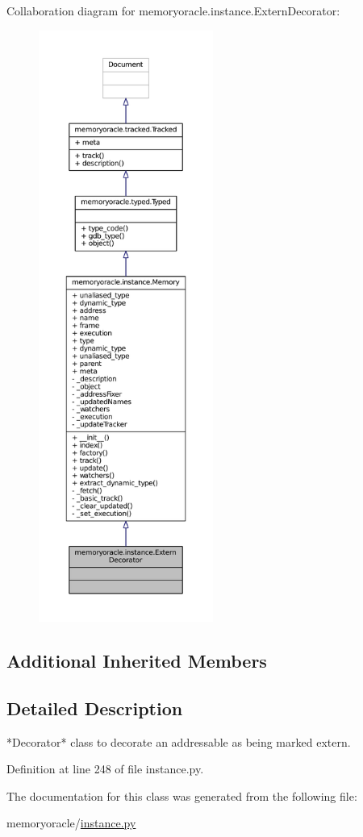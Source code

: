 Collaboration diagram for memoryoracle.\+instance.\+Extern\+Decorator\+:
\nopagebreak
\begin{figure}[H]
\begin{center}
\leavevmode
\includegraphics[height=550pt]{classmemoryoracle_1_1instance_1_1ExternDecorator__coll__graph}
\end{center}
\end{figure}
\subsection*{Additional Inherited Members}


\subsection{Detailed Description}
\begin{DoxyVerb}*Decorator* class to decorate an addressable as being marked extern.
\end{DoxyVerb}
 

Definition at line 248 of file instance.\+py.



The documentation for this class was generated from the following file\+:\begin{DoxyCompactItemize}
\item 
memoryoracle/\hyperlink{instance_8py}{instance.\+py}\end{DoxyCompactItemize}
